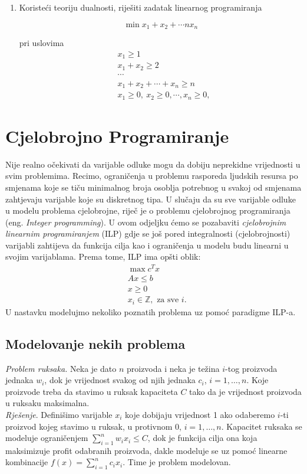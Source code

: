 \documentclass[a4paper, utf8, 11pt, colorlinks]{book}
\begin{document}
\begin{enumerate}
\item Koristeći teoriju dualnosti, riješiti zadatak linearnog programiranja

$$\min x_1+x_2+\cdots nx_n$$

pri uslovima
$$
\begin{aligned}
	& x_1\geqslant 1\\
	& x_1+x_2\geqslant 2 \\
	& \cdots\\
	& x_1+x_2+\cdots+x_n\geqslant n\\
	&x_1\geqslant 0,\ x_2\geqslant 0,\cdots,x_n\geqslant 0,
\end{aligned}$$
\end{enumerate}
\newpage
\chapter{Cjelobrojno Programiranje}

Nije realno očekivati da varijable odluke mogu da dobiju neprekidne vrijednosti u svim problemima. Recimo, ograničenja u problemu rasporeda ljudskih resursa po smjenama koje se tiču minimalnog broja osoblja potrebnog u svakoj od smjenama zahtjevaju varijable koje su diskretnog tipa. U slučaju da su sve varijable odluke u modelu problema cjelobrojne, riječ je o problemu cjelobrojnog programiranja (eng. \emph{Integer programming}). 
U ovom odjeljku ćemo se pozabaviti   \emph{cjelobrojnim linearnim programiranjem} (ILP) gdje se još pored integralnosti (cjelobrojnosti) varijabli zahtijeva da funkcija cilja kao i ograničenja u modelu budu linearni u svojim varijablama. Prema tome, ILP ima opšti oblik:
\begin{align}
    & \max c^T x \nonumber\\
    & A x \leq b \nonumber \\
    & x \geq 0 \nonumber\\
    & x_i \in \mathbb{Z}, \mbox{ za sve } i. \label{ilp-formulation}
\end{align}
U nastavku modelujmo nekoliko poznatih problema uz pomoć paradigme ILP-a. 

\section{Modelovanje nekih problema}

\emph{Problem ruksaka.} Neka je dato $n$ proizvoda i neka je težina $i$-tog proizvoda jednaka $w_i$, dok je vrijednost svakog od njih jednaka $c_i$, $i=1,\ldots,n$. Koje proizvode treba da stavimo u ruksak kapaciteta $C$ tako da je vrijednost proizvoda u ruksaku maksimalna. \\
\emph{Rješenje}. Definišimo varijable $x_i$ koje dobijaju vrijednost 1 ako odaberemo $i$-ti proizvod kojeg stavimo u ruksak, u protivnom 0, $i=1,\ldots,n$. Kapacitet ruksaka se modeluje ograničenjem $\sum_{i=1}^n w_i x_i \leq C$, dok je funkcija cilja ona koja maksimizuje profit odabranih proizvoda, dakle modeluje se uz pomoć linearne kombinacije $f(x) = \sum_{i=1}^n c_i x_i$. Time je problem modelovan.
\end{document}
